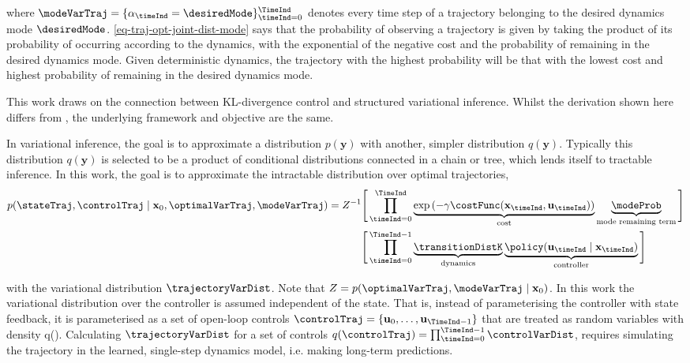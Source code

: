 \documentclass{mimosis-class/mimosis}
\numberwithin{equation}{chapter}
\newcommand{\state}{\ensuremath{\mathbf{x}}}
\newcommand{\control}{\ensuremath{\mathbf{u}}}
\newcommand{\modeVar}{\ensuremath{\alpha}}
\begin{document}
{where \(\modeVarTraj = \{\modeVar_{\timeInd}=\desiredMode \}_{\timeInd=0}^{\TimeInd}\)
denotes every time step of a trajectory belonging to the desired dynamics mode \(\desiredMode\).
\cref{eq-traj-opt-joint-dist-mode} says
that the probability of observing a trajectory is given by taking the product of its probability of occurring
according to the dynamics, with the exponential of the negative cost and the probability of remaining
in the desired dynamics mode.
Given deterministic dynamics, the trajectory with the highest probability will be that with the lowest
cost and highest probability of remaining in the desired dynamics mode.


This work draws on the connection between KL-divergence control \citep{rawlikStochastic2013}
and structured variational inference.
Whilst the derivation shown here differs from \cite{rawlikStochastic2013}, the underlying framework and
objective are the same.

In variational inference, the goal is to approximate a distribution \(p(\mathbf{y})\)
with another, simpler distribution \(q(\mathbf{y})\).
Typically this distribution \(q(\mathbf{y})\) is selected to be a product of conditional distributions connected in a
chain or tree, which lends itself to tractable inference.
In this work, the goal is to approximate the intractable distribution over optimal trajectories,
\begin{align} \label{eq-}
p(\stateTraj, \controlTraj \mid \state_0, \optimalVarTraj, \modeVarTraj)
= Z^{-1}
\Bigg[ \prod_{\timeInd=0}^{\TimeInd}
&\underbrace{\exp \left( - \gamma  \costFunc(\state_\timeInd, \control_\timeInd) \right)}_{\text{cost}}
\underbrace{\modeProb}_{\text{mode remaining term}}
\Bigg]
\nonumber \\
\Bigg[ \prod_{\timeInd=0}^{\TimeInd-1}
&\underbrace{ \transitionDistK}_{\text{dynamics}}
\underbrace{ \policy(\control_\timeInd \mid \state_\timeInd) }_{\text{controller}}
\Bigg]
\end{align}

with the variational distribution \(\trajectoryVarDist\).
Note that \(Z=p(\optimalVarTraj, \modeVarTraj \mid \state_0)\).
In this work the variational distribution over the controller is assumed independent of the state.
That is, instead of parameterising the controller with state feedback, it is parameterised as a set
of open-loop controls \(\controlTraj = \{\control_0, \ldots, \control_{\TimeInd-1}\}\) that are treated as random
variables with density q(\controlTraj).
Calculating \(\trajectoryVarDist\) for a set of controls
\(q(\controlTraj) = \prod_{\timeInd=0}^{\TimeInd-1} \controlVarDist\),
requires simulating the trajectory in the learned,
single-step dynamics model, i.e. making long-term predictions.

}
\end{document}
